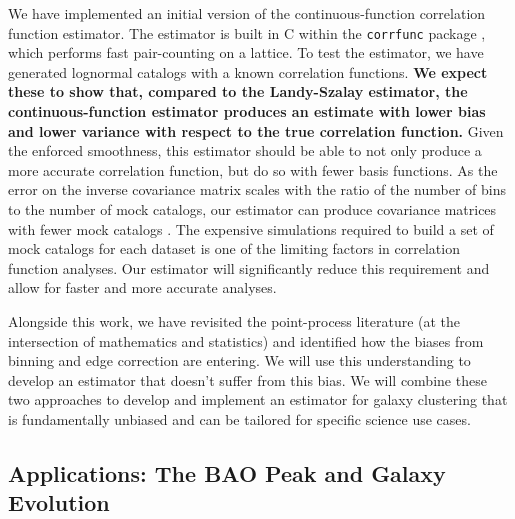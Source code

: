 \documentclass[12pt, fullpage, letterpaper]{article}
\begin{document}
We have implemented an initial version of the continuous-function correlation function estimator.
The estimator is built in C within the \texttt{corrfunc} package \citep{Sinha2017}, which performs fast pair-counting on a lattice.
To test the estimator, we have generated lognormal catalogs with a known correlation functions. 
\textbf{We expect these to show that, compared to the Landy-Szalay
  estimator, the continuous-function estimator produces an estimate with lower bias and
  lower variance with respect to the true correlation function.}
Given the enforced smoothness, this estimator should be able to not only produce a more accurate correlation function, but do so with fewer basis functions.
As the error on the inverse covariance matrix scales with the ratio of the number of bins to the number of mock catalogs, our estimator can produce covariance matrices with fewer mock catalogs \citep{Hartlap2007}.
The expensive simulations required to build a set of mock catalogs for each dataset is one of the limiting factors in correlation function analyses.
Our estimator will significantly reduce this requirement and allow for faster and more accurate analyses.

Alongside this work, we have revisited the point-process literature (at the intersection of mathematics and statistics) and identified how the biases from binning and edge correction are entering. 
We will use this understanding to develop an estimator that doesn't suffer from this bias.
We will combine these two approaches to develop and implement an estimator for galaxy clustering that is fundamentally unbiased and can be tailored for specific science use cases.

\subsection{Applications: The BAO Peak and Galaxy Evolution}
\end{document}
